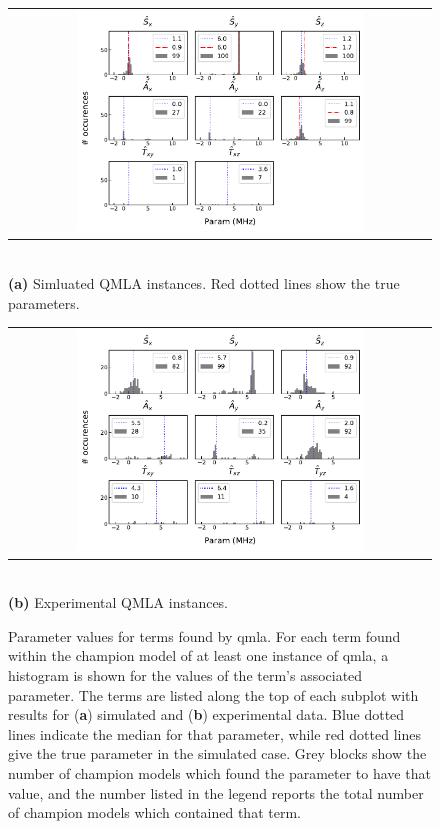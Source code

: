 \begin{figure}
    \centering
    \begin{tabular}{@{}c@{}}
        \centering
        \includegraphics[width=0.7\textwidth]{experimental_study/figures/params_simulation.pdf}
    \end{tabular}
    \\ \small \textbf{(a)} Simluated QMLA instances. Red dotted lines show the true parameters.
    
    \centering
    \begin{tabular}{@{}c@{}}
        \centering
        \includegraphics[width=0.7\textwidth]{experimental_study/figures/params_experimental.pdf}
    \end{tabular}
    \\
    \small \textbf{(b)} Experimental QMLA instances.
    \caption[
        Histograms for parameters learned by QMLA champion models on simulated and experimental data
    ]{
        Parameter values for terms found by \gls{qmla}. 
        For each term found within the \gls{champion model} of at least one \gls{instance} of \gls{qmla}, 
            a histogram is shown for the values of the term's associated parameter.
        The terms are listed along the top of each subplot with results for (\textbf{a}) simulated  and (\textbf{b}) experimental data. 
        Blue dotted lines indicate the median for that parameter, while red dotted lines give the true parameter in the simulated case. 
        Grey blocks show the number of champion models which found the parameter to have that value,
        and the number listed in the legend reports the total number of \glspl{champion model} which contained that term.
        \figtableref
    }
    \label{fig:nv_learned_params}
\end{figure}